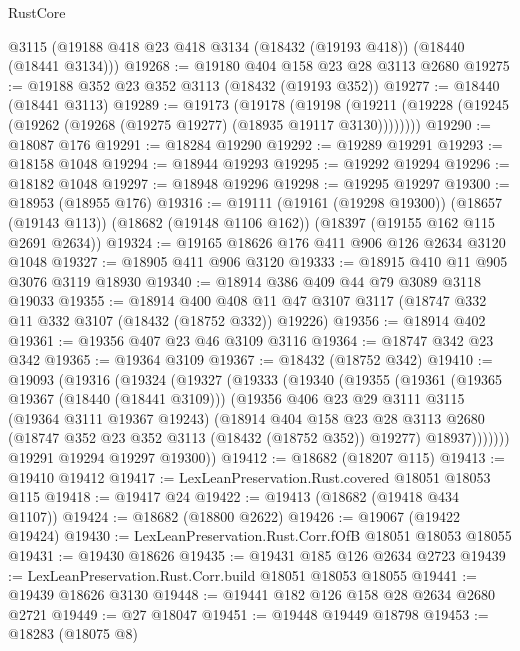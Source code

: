 \begin{lexlean}{RustCore}
\begin{coremodule}
    @3115
    (@19188 @418 @23 @418 @3134 (@18432 (@19193 @418)) (@18440 (@18441 @3134)))
@19268 := @19180 @404 @158 @23 @28 @3113 @2680
@19275 := @19188 @352 @23 @352 @3113 (@18432 (@19193 @352))
@19277 := @18440 (@18441 @3113)
@19289 := @19173
    (@19178
      (@19198 (@19211 (@19228 (@19245 (@19262 (@19268 (@19275 @19277) (@18935 @19117 @3130))))))))
@19290 := @18087 @176
@19291 := @18284 @19290
@19292 := @19289 @19291
@19293 := @18158 @1048
@19294 := @18944 @19293
@19295 := @19292 @19294
@19296 := @18182 @1048
@19297 := @18948 @19296
@19298 := @19295 @19297
@19300 := @18953 (@18955 @176)
@19316 := @19111
    (@19161 (@19298 @19300))
    (@18657 (@19143 @113))
    (@18682 (@19148 @1106 @162))
    (@18397 (@19155 @162 @115 @2691 @2634))
@19324 := @19165 @18626 @176 @411 @906 @126 @2634 @3120 @1048
@19327 := @18905 @411 @906 @3120
@19333 := @18915 @410 @11 @905 @3076 @3119 @18930
@19340 := @18914 @386 @409 @44 @79 @3089 @3118 @19033
@19355 := @18914
    @400
    @408
    @11
    @47
    @3107
    @3117
    (@18747 @332 @11 @332 @3107 (@18432 (@18752 @332)) @19226)
@19356 := @18914 @402
@19361 := @19356 @407 @23 @46 @3109 @3116
@19364 := @18747 @342 @23 @342
@19365 := @19364 @3109
@19367 := @18432 (@18752 @342)
@19410 := @19093
    (@19316
      (@19324
        (@19327
          (@19333
            (@19340
              (@19355
                (@19361
                  (@19365 @19367 (@18440 (@18441 @3109)))
                  (@19356
                    @406
                    @23
                    @29
                    @3111
                    @3115
                    (@19364 @3111 @19367 @19243)
                    (@18914
                      @404
                      @158
                      @23
                      @28
                      @3113
                      @2680
                      (@18747 @352 @23 @352 @3113 (@18432 (@18752 @352)) @19277)
                      @18937)))))))
        @19291
        @19294
        @19297
        @19300))
@19412 := @18682 (@18207 @115)
@19413 := @19410 @19412
@19417 := LexLeanPreservation.Rust.covered @18051 @18053 @115
@19418 := @19417 @24
@19422 := @19413 (@18682 (@19418 @434 @1107))
@19424 := @18682 (@18800 @2622)
@19426 := @19067 (@19422 @19424)
@19430 := LexLeanPreservation.Rust.Corr.fOfB @18051 @18053 @18055
@19431 := @19430 @18626
@19435 := @19431 @185 @126 @2634 @2723
@19439 := LexLeanPreservation.Rust.Corr.build @18051 @18053 @18055
@19441 := @19439 @18626 @3130
@19448 := @19441 @182 @126 @158 @28 @2634 @2680 @2721
@19449 := @27 @18047
@19451 := @19448 @19449 @18798
@19453 := @18283 (@18075 @8)

\end{coremodule}
\end{lexlean}
